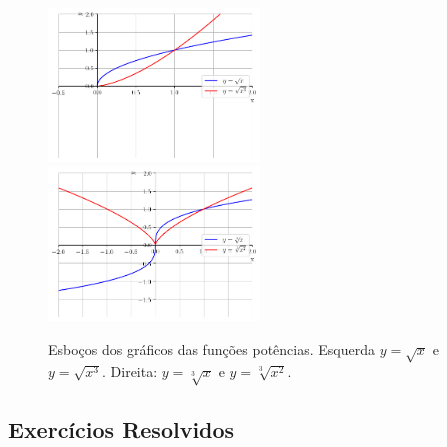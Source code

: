 \begin{figure}[H]
  \centering
  \includegraphics[width=0.5\textwidth]{./cap_funcao/dados/fig_funpot_racional/fig_funpot_racional_par}~
    \includegraphics[width=0.5\textwidth]{./cap_funcao/dados/fig_funpot_racional/fig_funpot_racional_impar}
  \caption{Esboços dos gráficos das funções potências. Esquerda $y=\sqrt{x}$ e $y=\sqrt{x^3}$. Direita: $y=\sqrt[3]{x}$ e $y=\sqrt[3]{x^2}$.}
  \label{fig:funpot_racional}
\end{figure}


\subsection*{Exercícios Resolvidos}

